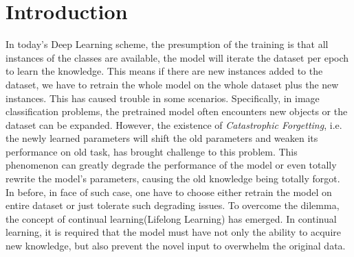 \section{Introduction}
In today's Deep Learning scheme, the presumption of the training is that all instances of the classes are available, the model will iterate the dataset per epoch to learn the knowledge. This means if there are new instances added to the dataset, we have to retrain the whole model on the whole dataset plus the new instances. This has caused trouble in some scenarios. Specifically, in image classification problems, the pretrained model often encounters new objects or the dataset can be expanded. However, the existence of \textit{Catastrophic Forgetting}\cite{mccloskey1989catastrophic}, i.e. the newly learned parameters will shift the old parameters and weaken its performance on old task, has brought challenge to this problem. This phenomenon can greatly degrade the performance of the model or even totally rewrite the model's parameters, causing the old knowledge being totally forgot. In before, in face of such case, one have to choose either retrain the model on entire dataset or just tolerate such degrading issues. To overcome the dilemma, the concept of continual learning(Lifelong Learning\cite{thrun1995lifelong}) has emerged. In continual learning, it is required that the model must have not only the ability to acquire new knowledge, but also prevent the novel input to overwhelm the original data. 


